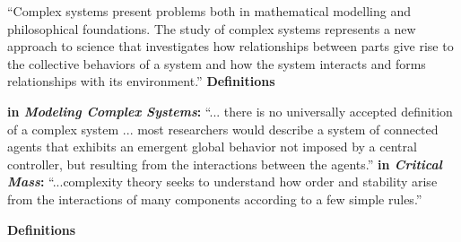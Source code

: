     ``Complex systems present problems both in mathematical modelling
and philosophical foundations. The study of complex systems represents
a new approach to science that investigates how relationships between
parts give rise to the collective behaviors of a system and how the
system interacts and forms relationships with its environment.''
  \textbf{Definitions}

  \textbf{
       in \textit{Modeling Complex Systems}:}\cite{boccara2004a}
    ``... there is no universally accepted definition
    of a complex system ... most researchers would describe
    a system of connected agents that exhibits
    an emergent global behavior not imposed by a central
    controller, but resulting from the interactions between
    the agents.''
  \textbf{ in \textit{Critical Mass}:}\cite{ball2004a}
    ``...complexity theory seeks to understand how order and 
    stability arise from the interactions of many components
    according to a few simple rules.''


  \textbf{Definitions}

